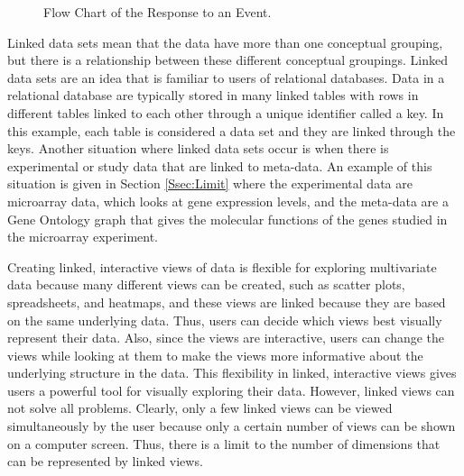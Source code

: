 \documentclass{article}[11pt]
\begin{document}

\begin{figure}[!h]
  \begin{center}    
    \caption{ Flow Chart of the Response to an Event. }
    \label{Fig:Event}
  \end{center}
\end{figure}

Linked data sets mean that the data have more than one conceptual grouping,
but there is a relationship between these different conceptual groupings.
Linked data sets are an idea that is familiar to users of relational
databases.  Data in a relational database are typically stored in many
linked tables with rows in different tables linked to each other through a
unique identifier called a key.  In this example, each table is
considered a data set and they are linked through the keys.  Another situation
where linked data sets occur is when there is experimental or study data that
are linked to meta-data.  An example of this situation is given in Section
\ref{Ssec:Limit} where the experimental data are microarray data, which looks
at gene expression levels, and the meta-data are a Gene Ontology graph that
gives the molecular functions of the genes studied in the microarray
experiment.  

Creating linked, interactive views of data is flexible for exploring
multivariate data because many different views can be created, such as
scatter plots, spreadsheets, and heatmaps, and these views are linked because
they are based on the same underlying data.  Thus, users can decide which
views best visually represent their data.  Also, since the views are
interactive, users can change the views while looking at them to make the
views more informative about the underlying structure in the data.  This
flexibility in linked, interactive views gives users a powerful tool for
visually exploring their data.  However, linked views can not solve all
problems.  Clearly, only a few linked views can be viewed simultaneously by
the user because only a certain number of views can be shown on a computer
screen.  Thus, there is a limit to the number of dimensions that can be
represented by linked views. 
\end{document}
